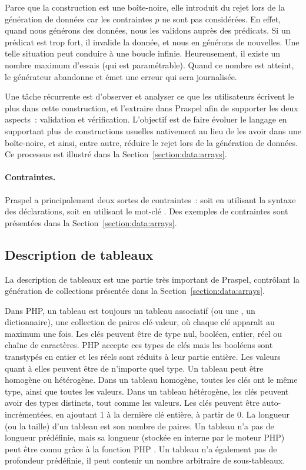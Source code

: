 Parce que la construction  est une boîte-noire, elle introduit du rejet
lors de la génération de données car les contraintes $p$ ne sont pas
considérées. En effet, quand nous générons des données, nous les validons auprès
des prédicats. Si un prédicat est trop fort, il invalide la donnée, et nous en
générons de nouvelles. Une telle situation peut conduire à une boucle infinie.
Heureusement, il existe un nombre maximum d'essais (qui est paramétrable). Quand
ce nombre est atteint, le générateur abandonne et émet une erreur qui sera
journalisée.

Une tâche récurrente est d'observer et analyser ce que les utilisateurs écrivent
le plus dans cette construction, et l'extraire dans Praspel afin de supporter
les deux aspects~: validation et vérification. L'objectif est de faire évoluer
le langage en supportant plus de constructions usuelles nativement au lieu de
les avoir dans une boîte-noire, et ainsi, entre autre, réduire le rejet lors de
la génération de données. Ce processus est illustré dans la
Section~\ref{section:data:arrays}.

\paragraph{Contraintes.} Praspel a principalement deux sortes de contraintes~:
soit en utilisant la syntaxe des déclarations, soit en utilisant le mot-clé
. Des exemples de contraintes sont présentées dans la
Section~\ref{section:data:arrays}.

\subsection{Description de tableaux}
\label{subsection:language:array}

La description de tableaux est une partie très important de Praspel, contrôlant
la génération de collections présentée dans la
Section~\ref{section:data:arrays}.

Dans PHP, un tableau est toujours un {\strong tableau associatif} (ou une
, un {\strong dictionnaire}), \ie une collection de paires
clé-valeur, où chaque clé apparaît au maximum une fois. Les clés peuvent être de
type nul, booléen, entier, réel ou chaîne de caractères. PHP accepte ces types
de clés mais les booléens sont transtypés en entier et les réels sont réduits à
leur partie entière. Les valeurs quant à elles peuvent être de n'importe quel
type. Un tableau peut être {\strong homogène} ou {\strong hétérogène}. Dans un
tableau homogène, toutes les clés ont le même type, ainsi que toutes les
valeurs. Dans un tableau hétérogène, les clés peuvent avoir des types distincts,
tout comme les valeurs.  Les clés peuvent être {\strong auto-incrémentées}, en
ajoutant 1 à la dernière clé entière, à partir de 0. La {\strong longueur} (ou
la {\strong taille}) d'un tableau est son nombre de paires. Un tableau n'a pas
de longueur prédéfinie, mais sa longueur (stockée en interne par le moteur PHP)
peut être connu grâce à la fonction PHP . Un tableau n'a également
pas de profondeur prédéfinie, \ie il peut contenir un nombre arbitraire de
sous-tableaux.

